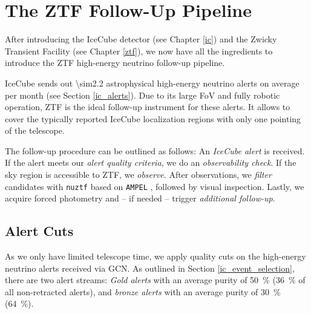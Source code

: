 \documentclass[
    a4paper, %
    fontsize=10pt, %
    twoside=true, %
    numbers=noenddot, %
    fontmethod=tex,
]{kaobook}
\begin{document}

\tableofcontents
\listoffigures

\let\cleardoublepage\bigskip
\let\clearpage\bigskip

\listoftables

\endgroup

\mainmatter
{}






\chapter{The ZTF Follow-Up Pipeline} \label{fupipeline}
After introducing the IceCube detector (see Chapter \ref{ic}) and the Zwicky Transient Facility (see Chapter \ref{ztf}), we now have all the ingredients to introduce the ZTF high-energy neutrino follow-up pipeline.

IceCube sends out \num{\sim2.2} astrophysical high-energy neutrino alerts on average per month (see Section \ref{ic_alerts}). Due to its large FoV and fully robotic operation, ZTF is the ideal follow-up instrument for these alerts. It allows to cover the typically reported IceCube localization regions with only one pointing of the telescope.

The follow-up procedure can be outlined as follows: An \textit{IceCube alert} is received. If the alert meets our \textit{alert quality criteria}, we do an \textit{observability check}. If the sky region is accessible to ZTF, we \textit{observe}. After observations, we \textit{filter} candidates with \texttt{nuztf} based on \texttt{AMPEL} , followed by visual inspection. Lastly, we acquire forced photometry and -- if needed -- trigger \textit{additional follow-up}.

\section{Alert Cuts}\label{alert_cuts}
As we only have limited telescope time, we apply quality cuts on the high-energy neutrino alerts received via GCN. As outlined in Section \ref{ic_event_selection}, there are two alert streams: \textit{Gold alerts} with an average purity of \SI{50}{\percent} (\SI{36}{\percent} of all non-retracted alerts), and \textit{bronze alerts} with an average purity of \SI{30}{\percent} (\SI{64}{\percent}).
\end{document}
